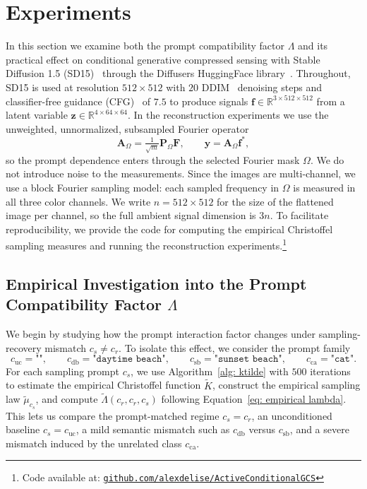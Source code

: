 \documentclass{article}
\theoremstyle{plain}
\theoremstyle{definition}
\theoremstyle{remark}
\begin{document}
\section{Experiments}\label{sec: experiments}
In this section we examine both the prompt compatibility factor $\Lambda$ and its practical effect on conditional generative compressed sensing with Stable Diffusion 1.5 (SD15)~\cite{rombach2022high} through the Diffusers HuggingFace library~\cite{von-platen-etal-2022-diffusers}. Throughout, SD15 is used at resolution $512\times 512$ with $20$ DDIM~\cite{song2021denoising} denoising steps and classifier-free guidance (CFG)~\cite{ho2021classifierfree} of $7.5$ to produce signals $\mathbf{f} \in \mathbb{R}^{3 \times 512 \times 512}$ from a latent variable $\mathbf z \in \mathbb R^{4\times 64\times 64}$. In the reconstruction experiments we use the unweighted, unnormalized,  subsampled  Fourier operator
\[
  \mathbf A_{\Omega}
  =
  \tfrac{1}{\sqrt{m}} \mathbf P_{\Omega} \mathbf F,
  \qquad
  \mathbf y
  =
  \mathbf A_{\Omega} \mathbf f^*,
\]
so the prompt dependence enters through the selected Fourier mask $\Omega$. We do not introduce noise to the measurements. Since the images are multi-channel, we use a block Fourier sampling model: each sampled frequency in $\Omega$ is measured in all three color channels. We write $n=512\times 512$ for the size of the flattened image per channel, so the full ambient signal dimension is $3n$. To facilitate reproducibility, we provide the code for computing the empirical Christoffel sampling measures and running the reconstruction experiments.\footnote{Code available at: \href{https://github.com/alexdelise/ActiveConditionalGCS.git}{\texttt{github.com/alexdelise/ActiveConditionalGCS}}}


\subsection{Empirical Investigation into the Prompt Compatibility Factor  \texorpdfstring{$\Lambda$}{Lambda}}
We begin by studying how the prompt interaction factor changes under sampling-recovery mismatch $c_s \neq c_r$. To isolate this effect, we consider the prompt family
\begin{equation}\label{eq: prompt family}
    c_{\mathrm{uc}} = \texttt{""}, \qquad
    c_{\mathrm{db}} = \texttt{"daytime beach"}, \qquad
    c_{\mathrm{sb}} = \texttt{"sunset beach"}, \qquad
    c_{\mathrm{ca}} = \texttt{"cat"}.
\end{equation}
For each sampling prompt $c_s$, we use Algorithm~\ref{alg: ktilde} with $500$ iterations to estimate the empirical Christoffel function $\widetilde K$, construct the empirical sampling law $\widetilde\mu_{c_s}$, and compute $\widetilde{\Lambda}(c_r,c_r,c_s)$ following Equation~\eqref{eq: empirical lambda}. This lets us compare the prompt-matched regime $c_s=c_r$, an unconditioned baseline $c_s=c_{\mathrm{uc}}$, a mild semantic mismatch such as $c_{\mathrm{db}}$ versus $c_{\mathrm{sb}}$, and a severe mismatch induced by the unrelated class $c_{\mathrm{ca}}$. 
\end{document}
